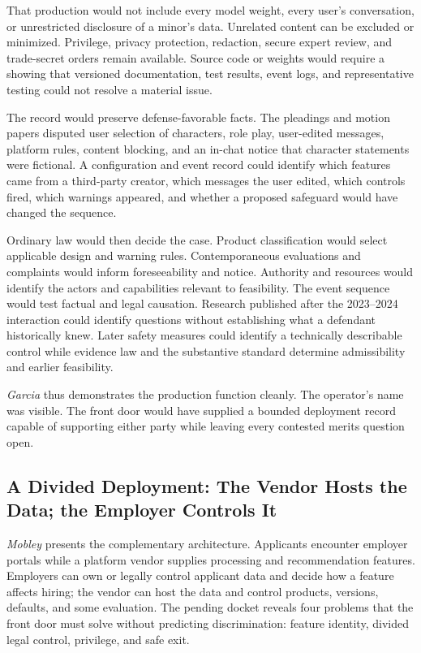 That production would not include every model weight, every user's conversation, or unrestricted disclosure of a minor's data. Unrelated content can be excluded or minimized. Privilege, privacy protection, redaction, secure expert review, and trade-secret orders remain available. Source code or weights would require a showing that versioned documentation, test results, event logs, and representative testing could not resolve a material issue.

The record would preserve defense-favorable facts. The pleadings and motion papers disputed user selection of characters, role play, user-edited messages, platform rules, content blocking, and an in-chat notice that character statements were fictional. A configuration and event record could identify which features came from a third-party creator, which messages the user edited, which controls fired, which warnings appeared, and whether a proposed safeguard would have changed the sequence.

Ordinary law would then decide the case. Product classification would select applicable design and warning rules. Contemporaneous evaluations and complaints would inform foreseeability and notice. Authority and resources would identify the actors and capabilities relevant to feasibility. The event sequence would test factual and legal causation. Research published after the 2023--2024 interaction could identify questions without establishing what a defendant historically knew. Later safety measures could identify a technically describable control while evidence law and the substantive standard determine admissibility and earlier feasibility.

\emph{Garcia} thus demonstrates the production function cleanly. The operator's name was visible. The front door would have supplied a bounded deployment record capable of supporting either party while leaving every contested merits question open.

\subsection{A Divided Deployment: The Vendor Hosts the Data; the Employer Controls It}
\label{sec:mobley-application}

\emph{Mobley} presents the complementary architecture. Applicants encounter employer portals while a platform vendor supplies processing and recommendation features. Employers can own or legally control applicant data and decide how a feature affects hiring; the vendor can host the data and control products, versions, defaults, and some evaluation. The pending docket reveals four problems that the front door must solve without predicting discrimination: feature identity, divided legal control, privilege, and safe exit.

